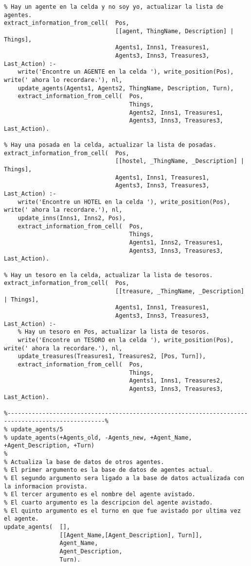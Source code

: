 \documentclass[a4paper,12pt]{report}
\begin{document}
\begin{scriptsize}
\begin{verbatim}
% Hay un agente en la celda y no soy yo, actualizar la lista de agentes.
extract_information_from_cell(  Pos, 
                                [[agent, ThingName, Description] | Things], 
                                Agents1, Inns1, Treasures1, 
                                Agents3, Inns3, Treasures3, Last_Action) :- 
    write('Encontre un AGENTE en la celda '), write_position(Pos), write(' ahora lo recordare.'), nl,
    update_agents(Agents1, Agents2, ThingName, Description, Turn),
    extract_information_from_cell(  Pos, 
                                    Things, 
                                    Agents2, Inns1, Treasures1, 
                                    Agents3, Inns3, Treasures3, Last_Action).

% Hay una posada en la celda, actualizar la lista de posadas.
extract_information_from_cell(  Pos, 
                                [[hostel, _ThingName, _Description] | Things], 
                                Agents1, Inns1, Treasures1, 
                                Agents3, Inns3, Treasures3, Last_Action) :- 
    write('Encontre un HOTEL en la celda '), write_position(Pos), write(' ahora la recordare.'), nl,
    update_inns(Inns1, Inns2, Pos),
    extract_information_from_cell(  Pos, 
                                    Things, 
                                    Agents1, Inns2, Treasures1, 
                                    Agents3, Inns3, Treasures3, Last_Action).

% Hay un tesoro en la celda, actualizar la lista de tesoros.
extract_information_from_cell(  Pos, 
                                [[treasure, _ThingName, _Description] | Things], 
                                Agents1, Inns1, Treasures1, 
                                Agents3, Inns3, Treasures3, Last_Action) :- 
    % Hay un tesoro en Pos, actualizar la lista de tesoros.
    write('Encontre un TESORO en la celda '), write_position(Pos), write(' ahora la recordare.'), nl,
    update_treasures(Treasures1, Treasures2, [Pos, Turn]),
    extract_information_from_cell(  Pos, 
                                    Things, 
                                    Agents1, Inns1, Treasures2, 
                                    Agents3, Inns3, Treasures3, Last_Action).

%--------------------------------------------------------------------------------------------------%
% update_agents/5
% update_agents(+Agents_old, -Agents_new, +Agent_Name, +Agent_Description, +Turn)
%
% Actualiza la base de datos de otros agentes. 
% El primer argumento es la base de datos de agentes actual.
% El segundo argumento sera ligado a la base de datos actualizada con la informacion provista.
% El tercer argumento es el nombre del agente avistado.
% El cuarto argumento es la descripcion del agente avistado.
% El quinto argumento es el turno en que fue avistado por ultima vez el agente.
update_agents(  [], 
                [[Agent_Name,[Agent_Description], Turn]], 
                Agent_Name, 
                Agent_Description, 
                Turn).


\end{verbatim}
\end{scriptsize}
\end{document}
